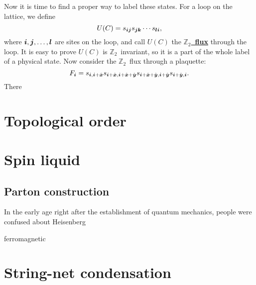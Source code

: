 \documentclass[hyperref, a4paper]{article}
\newcommand*{\concept}[1]{\underline{\textbf{#1}}}
\newcommand*{\Ztwo}{$\mathbb{Z}_2$\ }
\begin{document}
Now it is time to find a proper way to label these states.
For a loop on the lattice, we define
\begin{equation}
    U(C) = s_{\vb*{i} \vb*{j}} s_{\vb*{j} \vb*{k}} \cdots s_{\vb*{l} \vb*{i}},
\end{equation}
where $\vb*{i}, \vb*{j}, \ldots, \vb*{l}$ are sites on the loop, and call $U(C)$ the \concept{\Ztwo flux} through the loop. 
It is easy to prove $U(C)$ is \Ztwo invariant, so it is a part of the whole label of a physical state.
Now consider the \Ztwo flux through a plaquette:
\begin{equation}
    F_{\vb*{i}} = s_{\vb*{i}, \vb*{i}+\hat{\vb*{x}}} s_{\vb*{i}+\hat{\vb*{x}}, \vb*{i}+\hat{\vb*{x}}+\hat{\vb*{y}}} s_{\vb*{i}+\hat{\vb*{x}}+\hat{\vb*{y}}, \vb*{i}+\hat{\vb*{y}}} s_{\vb*{i}+\hat{\vb*{y}}, \vb*{i}}.
\end{equation}
There 

\section{Topological order}

\section{Spin liquid}

\subsection{Parton construction}

In the early age right after the establishment of quantum mechanics, people were confused about Heisenberg

ferromagnetic 

\section{String-net condensation}
\end{document}
